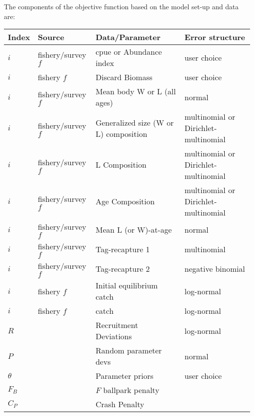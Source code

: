 The components of the objective function based on the model set-up and data are: 
\begin{longtable}{p{1cm} p{2.75cm} p{4.75cm} p{6.5cm}}
	\hline
	Index & Source & Data/Parameter & Error structure \Tstrut\Bstrut\\
	\hline	
	$i$ & fishery/survey $f$ & \gls{cpue} or Abundance index & user choice \Tstrut\\
	$i$ & fishery $f$		 & Discard Biomass			 & user choice \Tstrut\\
	$i$ & fishery/survey $f$ & Mean body W or L (all ages) & normal \Tstrut\\
	$i$ & fishery/survey $f$ & Generalized size (W or L) composition & multinomial or Dirichlet-multinomial \Tstrut\\
	$i$ & fishery/survey $f$ & L Composition	 		 & multinomial or Dirichlet-multinomial \Tstrut\\
	$i$ & fishery/survey $f$ & Age Composition			 & multinomial or Dirichlet-multinomial \Tstrut\\
	$i$ & fishery/survey $f$ & Mean L (or W)-at-age 	 & normal \Tstrut\\
	$i$ & fishery/survey $f$ & Tag-recapture 1			 & multinomial \Tstrut\\
	$i$ & fishery/survey $f$ & Tag-recapture 2			 & negative binomial \Tstrut\\
	$i$ & fishery $f$		 & Initial equilibrium catch & log-normal \Tstrut\\
	$i$ & fishery $f$		 & catch					 & log-normal \Tstrut\\
	$R$ & 					 & Recruitment Deviations	 & log-normal \Tstrut\\
	$P$ & 					 & Random parameter devs  	 & normal \Tstrut\\
	$\theta$ & 				 & Parameter priors			 & user choice \Tstrut\\
	$F_B$ & 				 & $F$ ballpark penalty		 & \Tstrut\\
	$C_P$ &					 & Crash Penalty			 & \Tstrut\Bstrut\\
	\hline
\end{longtable}




\pagebreak